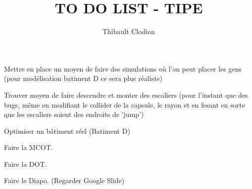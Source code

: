 \documentclass{article}
\title{TO DO LIST - TIPE}
\author{Thibault Clodion}
\newcommand{\cmark}{\ding{51}}%
\newcommand{\done}{\rlap{$\square$}{\raisebox{2pt}{\large\hspace{1pt}\cmark}}%
\hspace{-2.5pt}}
\begin{document}
\maketitle %

\begin{todolist}
    \item[\done] Mettre en place un moyen de faire des simulations où l'on peut placer les gens (pour modélisation batiment D ce sera plus réaliste)
    \item Trouver moyen de faire descendre et monter des escaliers (pour l'instant que des bugs, même en modifiant le collider de la capsule, le rayon
    et en fesant en sorte que les escaliers soient des endroits de 'jump')
    \item Optimiser un bâtiment réel (Batiment D)
    \item Faire la MCOT.
    \item Faire la DOT.
    \item Faire le Diapo. (Regarder Google Slide)
\end{todolist}
\end{document}
